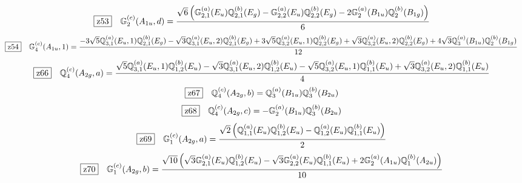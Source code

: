 \documentclass[fleqn,10pt,landscape]{jsarticle}
\begin{document}
\begin{dmath*}
\hspace*{3mm}\fbox{z53}\quad \mathbb{G}_{2}^{(c)}(A_{1u},d)=\frac{\sqrt{6} \left(\mathbb{G}_{2,1}^{(a)}(E_{u}) \mathbb{Q}_{2,1}^{(b)}(E_{g}) - \mathbb{G}_{2,2}^{(a)}(E_{u}) \mathbb{Q}_{2,2}^{(b)}(E_{g}) - 2 \mathbb{G}_{2}^{(a)}(B_{1u}) \mathbb{Q}_{2}^{(b)}(B_{1g})\right)}{6}
\end{dmath*}
\begin{dmath*}
\hspace*{3mm}\fbox{z54}\quad \mathbb{G}_{4}^{(c)}(A_{1u},1)=\frac{- 3 \sqrt{5} \mathbb{Q}_{3,1}^{(a)}(E_{u},1) \mathbb{Q}_{2,1}^{(b)}(E_{g}) - \sqrt{3} \mathbb{Q}_{3,1}^{(a)}(E_{u},2) \mathbb{Q}_{2,1}^{(b)}(E_{g}) + 3 \sqrt{5} \mathbb{Q}_{3,2}^{(a)}(E_{u},1) \mathbb{Q}_{2,2}^{(b)}(E_{g}) + \sqrt{3} \mathbb{Q}_{3,2}^{(a)}(E_{u},2) \mathbb{Q}_{2,2}^{(b)}(E_{g}) + 4 \sqrt{3} \mathbb{Q}_{3}^{(a)}(B_{1u}) \mathbb{Q}_{2}^{(b)}(B_{1g})}{12}
\end{dmath*}
\begin{dmath*}
\hspace*{3mm}\fbox{z66}\quad \mathbb{Q}_{4}^{(c)}(A_{2g},a)=\frac{\sqrt{5} \mathbb{Q}_{3,1}^{(a)}(E_{u},1) \mathbb{Q}_{1,2}^{(b)}(E_{u}) - \sqrt{3} \mathbb{Q}_{3,1}^{(a)}(E_{u},2) \mathbb{Q}_{1,2}^{(b)}(E_{u}) - \sqrt{5} \mathbb{Q}_{3,2}^{(a)}(E_{u},1) \mathbb{Q}_{1,1}^{(b)}(E_{u}) + \sqrt{3} \mathbb{Q}_{3,2}^{(a)}(E_{u},2) \mathbb{Q}_{1,1}^{(b)}(E_{u})}{4}
\end{dmath*}
\begin{dmath*}
\hspace*{3mm}\fbox{z67}\quad \mathbb{Q}_{4}^{(c)}(A_{2g},b)=\mathbb{Q}_{3}^{(a)}(B_{1u}) \mathbb{Q}_{3}^{(b)}(B_{2u})
\end{dmath*}
\begin{dmath*}
\hspace*{3mm}\fbox{z68}\quad \mathbb{Q}_{4}^{(c)}(A_{2g},c)=- \mathbb{G}_{2}^{(a)}(B_{1u}) \mathbb{Q}_{3}^{(b)}(B_{2u})
\end{dmath*}
\begin{dmath*}
\hspace*{3mm}\fbox{z69}\quad \mathbb{G}_{1}^{(c)}(A_{2g},a)=\frac{\sqrt{2} \left(\mathbb{Q}_{1,1}^{(a)}(E_{u}) \mathbb{Q}_{1,2}^{(b)}(E_{u}) - \mathbb{Q}_{1,2}^{(a)}(E_{u}) \mathbb{Q}_{1,1}^{(b)}(E_{u})\right)}{2}
\end{dmath*}
\begin{dmath*}
\hspace*{3mm}\fbox{z70}\quad \mathbb{G}_{1}^{(c)}(A_{2g},b)=\frac{\sqrt{10} \left(\sqrt{3} \mathbb{G}_{2,1}^{(a)}(E_{u}) \mathbb{Q}_{1,2}^{(b)}(E_{u}) - \sqrt{3} \mathbb{G}_{2,2}^{(a)}(E_{u}) \mathbb{Q}_{1,1}^{(b)}(E_{u}) + 2 \mathbb{G}_{2}^{(a)}(A_{1u}) \mathbb{Q}_{1}^{(b)}(A_{2u})\right)}{10}
\end{dmath*}
\end{document}
